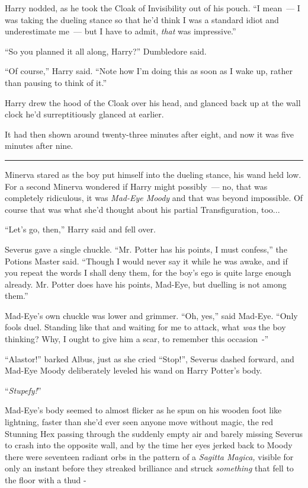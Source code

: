 Harry nodded, as he took the Cloak of Invisibility out of his pouch. ``I mean~--- I was taking the dueling stance so that he'd think I was a standard idiot and underestimate me~--- but I have to admit, \emph{that} was impressive.''

``So you planned it all along, Harry?'' Dumbledore said.

``Of course,'' Harry said. ``Note how I'm doing this as soon as I wake up, rather than pausing to think of it.''

Harry drew the hood of the Cloak over his head, and glanced back up at the wall clock he'd surreptitiously glanced at earlier.

It had then shown around twenty-three minutes after eight, and now it was five minutes after nine.

\begin{center}\rule{3in}{0.4pt}\end{center}

Minerva stared as the boy put himself into the dueling stance, his wand held low. For a second Minerva wondered if Harry might possibly~--- no, that was completely ridiculous, it was \emph{Mad-Eye Moody} and that was beyond impossible. Of course that was what she'd thought about his partial Transfiguration, too...

``Let's go, then,'' Harry said and fell over.

Severus gave a single chuckle. ``Mr. Potter has his points, I must confess,'' the Potions Master said. ``Though I would never say it while he was awake, and if you repeat the words I shall deny them, for the boy's ego is quite large enough already. Mr. Potter does have his points, Mad-Eye, but duelling is not among them.''

Mad-Eye's own chuckle was lower and grimmer. ``Oh, yes,'' said Mad-Eye. ``Only fools duel. Standing like that and waiting for me to attack, what \emph{was} the boy thinking? Why, I ought to give him a scar, to remember this occasion~-''

``Alastor!'' barked Albus, just as she cried ``Stop!'', Severus dashed forward, and Mad-Eye Moody deliberately leveled his wand on Harry Potter's body.

``\emph{Stupefy!}''

Mad-Eye's body seemed to almost flicker as he spun on his wooden foot like lightning, faster than she'd ever seen anyone move without magic, the red Stunning Hex passing through the suddenly empty air and barely missing Severus to crash into the opposite wall, and by the time her eyes jerked back to Moody there were seventeen radiant orbs in the pattern of a \emph{Sagitta Magica,} visible for only an instant before they streaked brilliance and struck \emph{something} that fell to the floor with a thud -

